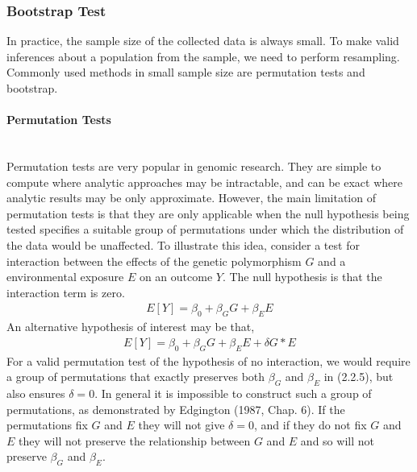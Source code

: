 \documentclass[11pt]{article}
\begin{document}
\subsubsection{{Bootstrap Test}}
In practice, the sample size of the collected data is always small. To make valid inferences about a population from the sample, we need to perform resampling. Commonly used methods in small sample size are permutation tests and bootstrap.\\
\paragraph{Permutation Tests}\mbox{}\\
Permutation tests are very popular in genomic research. They are simple to compute where analytic approaches may be intractable, and can be exact where analytic results may be only approximate. However, the main limitation of permutation tests is that they are only applicable when the null hypothesis being tested specifies a suitable group of permutations under which the distribution of the data would be unaffected. To illustrate this idea, consider a test for interaction between the effects of the genetic polymorphism $G$ and a environmental exposure $E$ on an outcome $Y$. The null hypothesis is that the interaction term is zero.
\begin{align}
E[Y]=\beta_0+\beta_GG+\beta_EE
\end{align}
An alternative hypothesis of interest may be that,
\begin{align*}
E[Y]=\beta_0+\beta_GG+\beta_EE+\delta G*E
\end{align*}
For a valid permutation test of the hypothesis of no interaction, we would require a group of permutations that exactly preserves both $\beta_G$ and $\beta_E$ in (2.2.5), but also ensures $\delta=0$. In general it is impossible to construct such a group of permutations, as demonstrated by Edgington (1987, Chap. 6). If the permutations fix $G$ and $E$ they will not give $\delta=0$, and if they do not fix $G$ and $E$ they will not preserve the relationship between $G$ and $E$ and so will not preserve $\beta_G$ and $\beta_E$.
\end{document}

